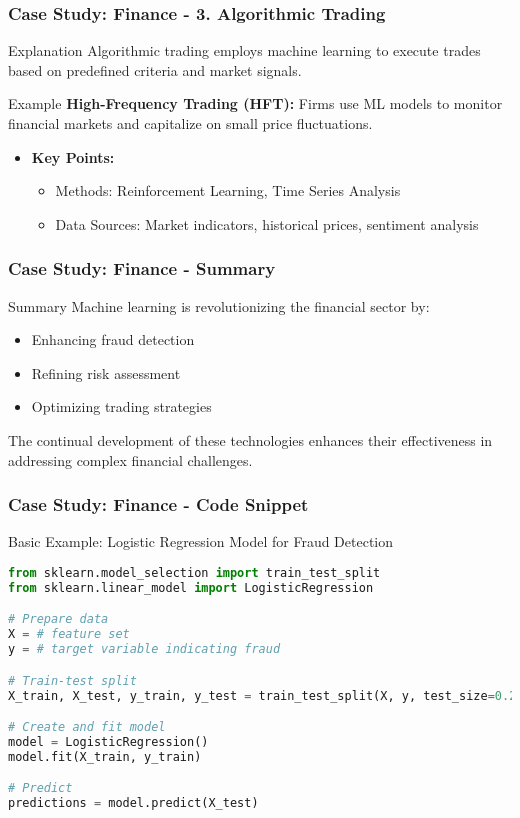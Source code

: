 \documentclass[aspectratio=169]{beamer}
\begin{document}
\begin{frame}
    \frametitle{Case Study: Finance - 3. Algorithmic Trading}
    \begin{block}{Explanation}
        Algorithmic trading employs machine learning to execute trades based on predefined criteria and market signals.
    \end{block}
    
    \begin{block}{Example}
        \textbf{High-Frequency Trading (HFT):} Firms use ML models to monitor financial markets and capitalize on small price fluctuations.
    \end{block}
    
    \begin{itemize}
        \item \textbf{Key Points:}
        \begin{itemize}
            \item Methods: Reinforcement Learning, Time Series Analysis
            \item Data Sources: Market indicators, historical prices, sentiment analysis
        \end{itemize}
    \end{itemize}
\end{frame}

\begin{frame}
    \frametitle{Case Study: Finance - Summary}
    \begin{block}{Summary}
        Machine learning is revolutionizing the financial sector by:
        \begin{itemize}
            \item Enhancing fraud detection
            \item Refining risk assessment
            \item Optimizing trading strategies
        \end{itemize}
        The continual development of these technologies enhances their effectiveness in addressing complex financial challenges.
    \end{block}
\end{frame}

\begin{frame}[fragile]
    \frametitle{Case Study: Finance - Code Snippet}
    \begin{block}{Basic Example: Logistic Regression Model for Fraud Detection}
    \begin{lstlisting}[language=Python]
from sklearn.model_selection import train_test_split
from sklearn.linear_model import LogisticRegression

# Prepare data
X = # feature set
y = # target variable indicating fraud

# Train-test split
X_train, X_test, y_train, y_test = train_test_split(X, y, test_size=0.2)

# Create and fit model
model = LogisticRegression()
model.fit(X_train, y_train)

# Predict
predictions = model.predict(X_test)
    \end{lstlisting}
    \end{block}
\end{frame}
\end{document}
